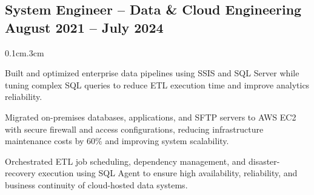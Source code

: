 \subsection{{System Engineer – Data \& Cloud Engineering \hfill August 2021 -- July 2024}}
\vspace{.70em}
\begin{adjustwidth}{0.1cm}{.3cm}

\begin{zitemize}

\item Built and optimized enterprise data pipelines using SSIS and SQL Server while tuning complex SQL queries to reduce ETL execution time and improve analytics reliability.

\item Migrated on-premises databases, applications, and SFTP servers to AWS EC2 with secure firewall and access configurations, reducing infrastructure maintenance costs by 60\% and improving system scalability.

\item Orchestrated ETL job scheduling, dependency management, and disaster-recovery execution using SQL Agent to ensure high availability, reliability, and business continuity of cloud-hosted data systems.

\end{zitemize}

\end{adjustwidth}
\vspace{.70em}
\vspace{-.75em}
